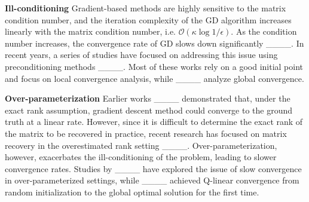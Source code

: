 \textbf{Ill-conditioning}
Gradient-based methods are highly sensitive to the matrix condition number, and the iteration complexity of the GD algorithm increases linearly with the matrix condition number, i.e. $\mathcal{O}(\kappa \log1/\epsilon)$. As the condition number increases, the convergence rate of GD slows down significantly ____. In recent years, a series of studies have focused on addressing this issue using preconditioning methods ____. Most of these works rely on a good initial point and focus on local convergence analysis, while ____ analyze global convergence.




\textbf{Over-parameterization} Earlier works ____ demonstrated that, under the exact rank assumption, gradient descent method could converge to the ground truth at a linear rate. However, since it is difficult to determine the exact rank of the matrix to be recovered in practice, recent research has focused on matrix recovery in the overestimated rank setting ____. Over-parameterization, however, exacerbates the ill-conditioning of the problem, leading to slower convergence rates. Studies by ____ have explored the issue of slow convergence in over-parameterized settings, while ____ achieved Q-linear convergence from random initialization to the global optimal solution for the first time.


